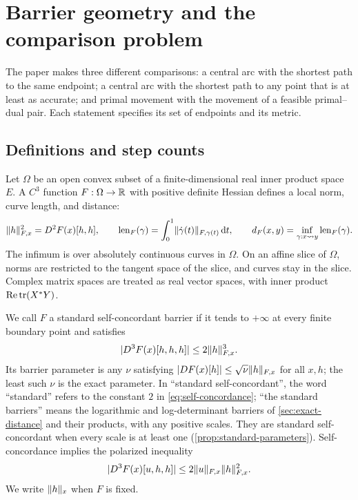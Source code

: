 \section{Barrier geometry and the comparison problem}
\label{sec:foundations}

The paper makes three different comparisons: a central arc with the
shortest path to the same endpoint; a central arc with the shortest path
to any point that is at least as accurate; and primal movement with the
movement of a feasible primal--dual pair. Each statement specifies its
set of endpoints and its metric.

\subsection{Definitions and step counts}
Let $\Omega$ be an open convex subset of a finite-dimensional real inner
product space $E$. A $C^3$ function $F:\Omega\to\mathbb R$ with positive definite
Hessian defines a local norm, curve length, and distance:
\begin{equation}
 \lVert h\rVert_{F,x}^2=D^2F(x)[h,h],\qquad
 \operatorname{len}_F(\gamma)=\int_0^1\lVert \dot\gamma(t)\rVert_{F,\gamma(t)}\,\mathrm d t,
 \qquad
 d_F(x,y)=\inf_{\gamma:x\leadsto y}\operatorname{len}_F(\gamma).
 \label{eq:metric-definitions}
\end{equation}
The infimum is over absolutely continuous curves in $\Omega$.
On an affine slice of $\Omega$, norms are restricted to the tangent
space of the slice, and curves stay in the slice. Complex matrix
spaces are treated as real vector spaces, with inner product $\operatorname{Re}\operatorname{tr}(X^*Y)$.

We call $F$ a standard self-concordant barrier if it tends to $+\infty$
at every finite boundary point and satisfies
\begin{equation}
 \lvert D^3F(x)[h,h,h]\rvert\leq2\lVert h\rVert_{F,x}^3.
 \label{eq:self-concordance}
\end{equation}
Its barrier parameter is any $\nu$ satisfying
$\lvert DF(x)[h]\rvert\leq\sqrt\nu\lVert h\rVert_{F,x}$ for all $x,h$; the least
such $\nu$ is the exact parameter.
In ``standard self-concordant'', the word ``standard'' refers to the
constant $2$ in \eqref{eq:self-concordance}; ``the standard barriers''
means the logarithmic and log-determinant barriers of
\cref{sec:exact-distance} and their products, with any positive scales.
They are standard self-concordant when every scale is at least one
(\cref{prop:standard-parameters}).
Self-concordance implies the polarized inequality
\begin{equation}
 \lvert D^3F(x)[u,h,h]\rvert\leq2\lVert u\rVert_{F,x}\lVert h\rVert_{F,x}^2.
 \label{eq:mixed-SC}
\end{equation}
We write $\lVert h\rVert_x$ when $F$ is fixed.

